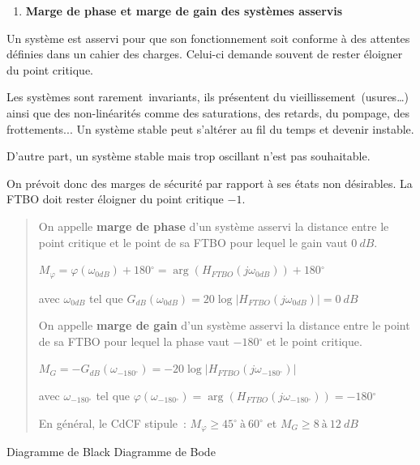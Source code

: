 \begin{enumerate}
\def\labelenumi{\arabic{enumi}.}
\setcounter{enumi}{1}
\item
  \protect\hypertarget{mod-_Toc59134858}{}{}\textbf{Marge de phase et marge de gain des systèmes asservis}
\end{enumerate}

Un système est asservi pour que son fonctionnement soit conforme à des attentes définies dans un cahier des charges. Celui-ci demande souvent de rester éloigner du point critique.

Les systèmes sont rarement~invariants, ils présentent du vieillissement~(usures\ldots) ainsi que des non-linéarités comme des saturations, des retards, du pompage, des frottements... Un système stable peut s'altérer au fil du temps et devenir instable.

D'autre part, un système stable mais trop oscillant n'est pas souhaitable.

On prévoit donc des marges de sécurité par rapport à ses états non désirables. La FTBO doit rester éloigner du point critique \(- 1\).

\begin{quote}
On appelle \textbf{marge de phase} d'un système asservi la distance entre le point critique et le point de sa FTBO pour lequel le gain vaut \(0\ dB\).

\(M_{\varphi} = \varphi{(\omega_{0dB})} + 180{^\circ} = \arg{\left( H_{FTBO}\left( j\omega_{0dB} \right) \right) + 180{^\circ}}\)

avec \(\omega_{0dB}\) tel que \(G_{dB}\left( \omega_{0dB} \right) = 20\log{\left| H_{FTBO}\left( j\omega_{0dB} \right) \right| = 0\ dB}\)

On appelle \textbf{marge de gain} d'un système asservi la distance entre le point de sa FTBO pour lequel la phase vaut \(- 180{^\circ}\) et le point critique.

\(M_{G} = - G_{dB}\left( \omega_{- 180{^\circ}} \right) = - 20\log\left| H_{FTBO}\left( j\omega_{- 180{^\circ}} \right) \right|\)

avec \(\omega_{- 180{^\circ}}\) tel que \(\varphi{(\omega_{- 180{^\circ}})} = \arg\left( H_{FTBO}\left( j\omega_{- 180{^\circ}} \right) \right) = - 180{^\circ}\)

En général, le CdCF stipule~: \(M_{\varphi} \geq 45{^\circ}\ à\ 60{^\circ}\) et \(M_{G} \geq 8\ à\ 12\ dB\)
\end{quote}

Diagramme de Black Diagramme de Bode

